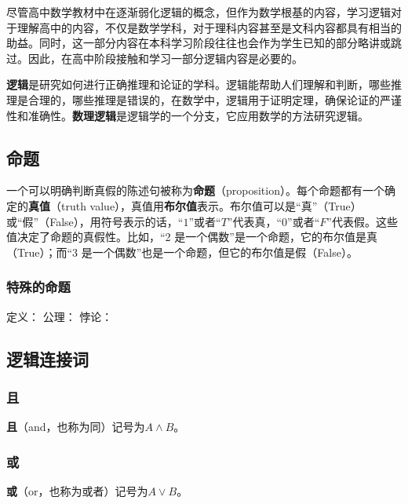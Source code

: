
\begin{issues}
\issueDraft
\end{issues}

尽管高中数学教材中在逐渐弱化逻辑的概念，但作为数学根基的内容，学习逻辑对于理解高中的内容，不仅是数学学科，对于理科内容甚至是文科内容都具有相当的助益。同时，这一部分内容在本科学习阶段往往也会作为学生已知的部分略讲或跳过。因此，在高中阶段接触和学习一部分逻辑内容是必要的。

\textbf{逻辑}是研究如何进行正确推理和论证的学科。逻辑能帮助人们理解和判断，哪些推理是合理的，哪些推理是错误的，在数学中，逻辑用于证明定理，确保论证的严谨性和准确性。\textbf{数理逻辑}是逻辑学的一个分支，它应用数学的方法研究逻辑。


\subsection{命题}


一个可以明确判断真假的陈述句被称为\textbf{命题}（proposition）。每个命题都有一个确定的\textbf{真值}（truth value），真值用\textbf{布尔值}表示。布尔值可以是“真”（True）或“假”（False），用符号表示的话，“$1$”或者“$T$”代表真，“$0$”或者“$F$”代表假。这些值决定了命题的真假性。比如，“2 是一个偶数”是一个命题，它的布尔值是真（True）；而“3 是一个偶数”也是一个命题，但它的布尔值是假（False）。

\subsubsection{特殊的命题}
定义：
公理：
悖论：

\subsection{逻辑连接词}

\subsubsection{且}

\textbf{且}（and，也称为同）记号为$A\land B$。

\subsubsection{或}

\textbf{或}（or，也称为或者）记号为$A\lor B$。



